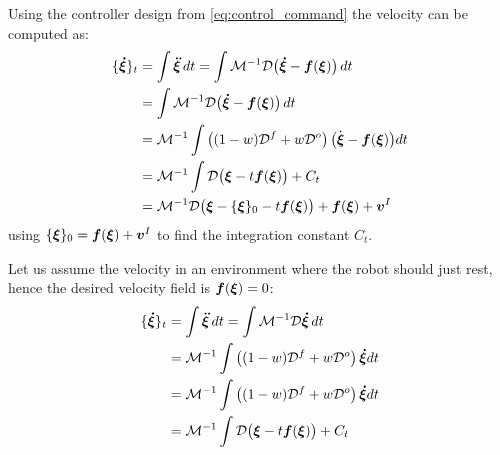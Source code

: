 Using the controller design from \eqref{eq:control_command} the velocity can be computed as:
\begin{equation}
\begin{split}
	\{ \vecs{\dot \xi} \}_{t} 
	& = \int \vecs{\ddot \xi} \, dt = \int \matd{M}^{-1} \matd{D}  \bigl( \vecs{\dot \xi} - \vecs f(\vecs \xi) \bigr) \, dt \\
	& = \int \matd{M}^{-1} \matd{D} \bigl( \vecs{\dot \xi} - \vecs f(\vecs \xi) \bigr) \, dt \\
	& = \matd{M}^{-1} \int \left( (1 - w) \matd{D}^f + w \matd{D}^{o} \right)  \bigl( \dot{\vecs \xi} - \vecs f(\vecs \xi) \bigr) dt\\
	& = \matd{M}^{-1} \int  \matd{D}\bigl( \vecs \xi - t \vecs f(\vecs \xi) \bigr) + C_t \\
	&  = \matd{M}^{-1} \matd{D}  \bigl( \vecs \xi - \{\vecs \xi\}_0  - t \vecs f(\vecs \xi) \bigr) + \vecs f(\vecs \xi) + \vecs v^I \\
\end{split}
\label{eq:velocity_evolution}
\end{equation}
using $\{ {\boldsymbol{\xi}} \}_0 = \boldsymbol{f}(\boldsymbol{\xi}) + \boldsymbol{v}^I$ to find the integration constant $C_t$.

Let us assume the velocity in an environment where the robot should just rest, hence the desired velocity field is $\boldsymbol{f}(\boldsymbol{\xi}) = 0$:
\begin{equation}
\begin{split}
	\{ \vecs{\dot \xi} \}_{t} 
	& = \int \vecs{\ddot \xi} \, dt = \int \matd{M}^{-1} \matd{D} \vecs{\dot \xi} \, dt \\
	& = \matd{M}^{-1} \int \left( (1 - w) \matd{D}^f + w \matd{D}^{o} \right)  \vecs{\dot \xi} dt\\
	& = \matd{M}^{-1} \int \left( (1 - w) \matd{D}^f + w \matd{D}^{o} \right)  \vecs{\dot \xi} dt\\
	& = \matd{M}^{-1} \int  \matd{D}\bigl( \vecs \xi - t \vecs f(\vecs \xi) \bigr) + C_t \\
	\end{split}
\label{eq:velocity_evolution}
\end{equation}

